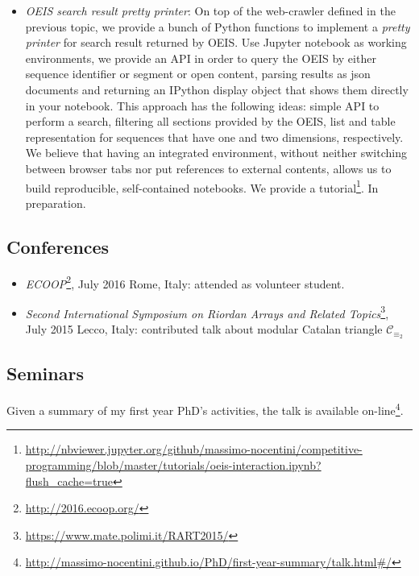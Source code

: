 \documentclass[10pt,a4paper]{scrartcl}
\begin{document}
\begin{itemize}
        \item\emph{OEIS search result pretty printer}: On top of the web-crawler defined in the previous topic, 
            we provide a bunch of Python functions to implement a
            \emph{pretty printer} for search result returned by OEIS. Use Jupyter notebook as working
            environments, we provide an API in order to query the OEIS by either sequence identifier or
            segment or open content, parsing results as json documents and returning an IPython display object
            that shows them directly in your notebook. This approach has the following ideas: simple API to 
            perform a search, filtering all sections provided by the OEIS, list and table representation 
            for sequences that have one and two dimensions, respectively. We believe that having an integrated
            environment, without neither switching between browser tabs nor put references to external contents, 
            allows us to build reproducible, self-contained notebooks. We provide a tutorial\footnote{\url{http://nbviewer.jupyter.org/github/massimo-nocentini/competitive-programming/blob/master/tutorials/oeis-interaction.ipynb?flush_cache=true}}. In preparation.

    \end{itemize}
    
    
    \subsection{Conferences}

    \begin{itemize}
        \item \emph{ECOOP}\footnote{\url{http://2016.ecoop.org/}}, July 2016 Rome, Italy: attended as volunteer student.
        \item \emph{Second International Symposium on Riordan Arrays and Related Topics}\footnote{\url{https://www.mate.polimi.it/RART2015/}}, 
            July 2015 Lecco, Italy: contributed talk about modular Catalan triangle $\mathcal{C}_{\equiv_{2}}$
    \end{itemize}

    \subsection{Seminars}

    Given a summary of my first year PhD's activities, the talk is available on-line\footnote{\url{http://massimo-nocentini.github.io/PhD/first-year-summary/talk.html#/}}.
\end{document}
